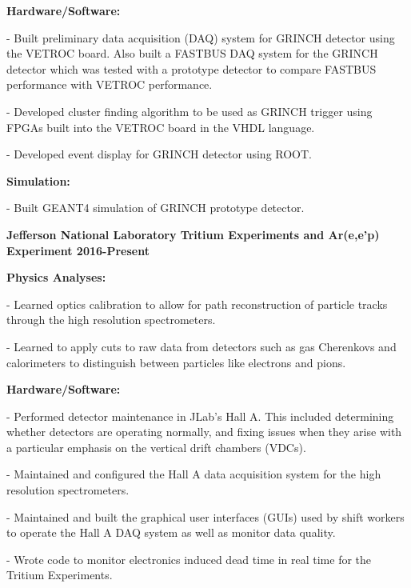 \documentclass[letterpaper,10pt]{article}
\renewenvironment{itemize}{
  \begin{list}{}{
    \setlength{\leftmargin}{1.5em}
  }
}{
  \end{list}
}
\begin{document}
{\begin{itemize}
\begin{itemize}
  \item \textbf{Hardware/Software:}
    \begin{itemize}\itemsep1pt \parskip0pt 
     \item - Built preliminary data acquisition (DAQ) system for GRINCH detector using the VETROC board. Also built a FASTBUS DAQ system for the GRINCH detector which was tested with a prototype detector to compare FASTBUS performance with VETROC performance.
     \item - Developed cluster finding algorithm to be used as GRINCH trigger using FPGAs built into the VETROC board in the VHDL language.
     \item - Developed event display for GRINCH detector using ROOT. 
    \end{itemize}
    
   \item \textbf{Simulation:}
     \begin{itemize}\itemsep1pt \parskip0pt 
      \item - Built GEANT4 simulation of GRINCH prototype detector.
     \end{itemize} 
 \end{itemize}
 
 \item {\large {\bf Jefferson National Laboratory Tritium Experiments and Ar(e,e'p) Experiment 2016-Present} }

 \begin{itemize}\itemsep1pt \parskip0pt 
  \item \textbf{Physics Analyses:}
    \begin{itemize}\itemsep1pt \parskip0pt 
     \item - Learned optics calibration to allow for path reconstruction of particle tracks through the high resolution spectrometers.
     \item - Learned to apply cuts to raw data from detectors such as gas Cherenkovs and calorimeters to distinguish between particles like electrons and pions.
     \end{itemize}

  \item \textbf{Hardware/Software:}
    \begin{itemize}\itemsep1pt \parskip0pt 
     \item - Performed detector maintenance in JLab's Hall A. This included determining whether detectors are operating normally, and fixing issues when they arise with a particular emphasis on the vertical drift chambers (VDCs). 
     \item - Maintained and configured the Hall A data acquisition system for the high resolution spectrometers.
     \item - Maintained and built the graphical user interfaces (GUIs) used by shift workers to operate the Hall A DAQ system as well as monitor data quality.
     \item - Wrote code to monitor electronics induced dead time in real time for the Tritium Experiments.
    \end{itemize}
    

\end{itemize}
\end{itemize}}
\end{document}
